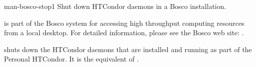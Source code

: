 \begin{ManPage}{}{man-bosco-stop}{1}
{Shut down HTCondor daemons in a Bosco installation.}


\Synopsis {}

\Description

 is part of the Bosco system for accessing high
throughput computing resources from a local desktop.
For detailed information, please see the Bosco web site:
.

 shuts down the HTCondor daemons that are installed
and running as part of the Personal HTCondor.
It is the equivalent of .


\end{ManPage}
